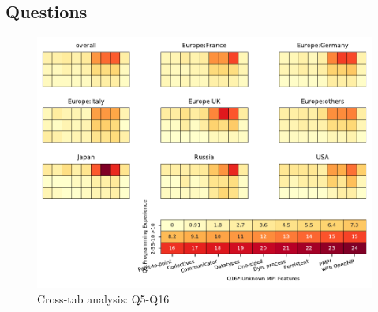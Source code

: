 
\subsection{Questions}


\begin{figure}
\begin{center}
\includegraphics[width=12cm]{../pdfs/Q5-Q16.pdf}
\caption{Cross-tab analysis: Q5-Q16}
\label{fig:Q5-Q16}
\end{center}
\end{figure}
